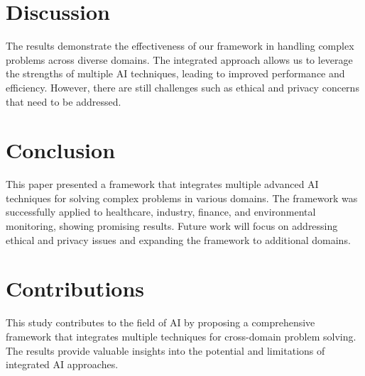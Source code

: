 \documentclass{article}
\begin{document}
\section{Discussion}
The results demonstrate the effectiveness of our framework in handling complex problems across diverse domains. The integrated approach allows us to leverage the strengths of multiple AI techniques, leading to improved performance and efficiency. However, there are still challenges such as ethical and privacy concerns that need to be addressed.

\section{Conclusion}
This paper presented a framework that integrates multiple advanced AI techniques for solving complex problems in various domains. The framework was successfully applied to healthcare, industry, finance, and environmental monitoring, showing promising results. Future work will focus on addressing ethical and privacy issues and expanding the framework to additional domains.

\section{Contributions}
This study contributes to the field of AI by proposing a comprehensive framework that integrates multiple techniques for cross-domain problem solving. The results provide valuable insights into the potential and limitations of integrated AI approaches.
\end{document}
